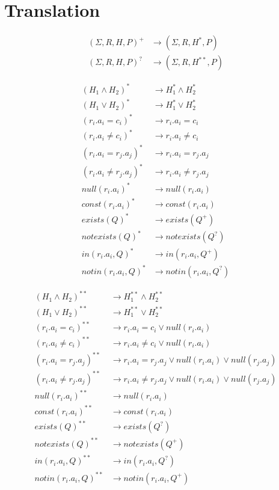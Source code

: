 \section{Translation}

\begin{align*}
	(\Sigma,R,H,P)^+ & \rightarrow (\Sigma,R,H^*,P) \\
	(\Sigma,R,H,P)^? & \rightarrow (\Sigma,R,H^{**},P) 
\end{align*}

\begin{align*}
	(H_1 \land H_2)^* & \rightarrow H_1^* \land H_2^* \\
	(H_1 \lor H_2)^* & \rightarrow H_1^* \lor H_2^* \\
	(r_i.a_i = c_i)^* & \rightarrow r_i.a_i = c_i \\
	(r_i.a_i \neq c_i)^*& \rightarrow r_i.a_i \neq c_i \\
	(r_i.a_i = r_j.a_j)^* & \rightarrow r_i.a_i = r_j.a_j \\
	(r_i.a_i \neq r_j.a_j)^* & \rightarrow r_i.a_i \neq r_j.a_j \\
	null(r_i.a_i)^* & \rightarrow null(r_i.a_i) \\
	const(r_i.a_i)^* & \rightarrow const(r_i.a_i) \\
	exists(Q)^* & \rightarrow exists(Q^+) \\
	notexists(Q)^* & \rightarrow notexists(Q^?) \\
	in(r_i.a_i,Q)^* & \rightarrow in(r_i.a_i,Q^+) \\
	notin(r_i.a_i,Q)^* & \rightarrow notin(r_i.a_i,Q^?) 
\end{align*}

\begin{align*}
	(H_1 \land H_2)^{**} & \rightarrow H_1^{**} \land H_2^{**} \\
	(H_1 \lor H_2)^{**} & \rightarrow H_1^{**} \lor H_2^{**} \\
	(r_i.a_i = c_i)^{**} & \rightarrow r_i.a_i = c_i \lor null(r_i.a_i)\\
	(r_i.a_i \neq c_i)^{**}& \rightarrow r_i.a_i \neq c_i \lor null(r_i.a_i)\\
	(r_i.a_i = r_j.a_j)^{**} & \rightarrow r_i.a_i = r_j.a_j \lor null(r_i.a_i) \lor null(r_j.a_j)\\
	(r_i.a_i \neq r_j.a_j)^{**} & \rightarrow r_i.a_i \neq r_j.a_j  \lor null(r_i.a_i) \lor null(r_j.a_j)\\
	null(r_i.a_i)^{**} & \rightarrow null(r_i.a_i) \\
	const(r_i.a_i)^{**} & \rightarrow const(r_i.a_i) \\
	exists(Q)^{**} & \rightarrow exists(Q^?) \\
	notexists(Q)^{**} & \rightarrow notexists(Q^+) \\
	in(r_i.a_i,Q)^{**} & \rightarrow in(r_i.a_i,Q^?) \\
	notin(r_i.a_i,Q)^{**} & \rightarrow notin(r_i.a_i,Q^+) 
\end{align*}

